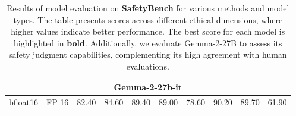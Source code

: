 \begin{table*}[!ht]
{\begin{tabular}{ll c ccccccc}
        \midrule
        \multicolumn{10}{c}{\textbf{Gemma-2-27b-it}}\\ 
        \midrule
        
        bfloat16 & FP 16 & 82.40 &	84.60 &	89.40 &	89.00 &	78.60 &	90.20 &	89.70 &	61.90 \\
        \bottomrule

    \end{tabular}}
    \caption{Results of model evaluation on \textbf{SafetyBench} for various methods and model types. The table presents scores across different ethical dimensions, where higher values indicate better performance. The best score for each model is highlighted in \textbf{bold}. Additionally, we evaluate Gemma-2-27B to assess its safety judgment capabilities, complementing its high agreement with human evaluations.}

    \label{tab:safetybench}
\end{table*}